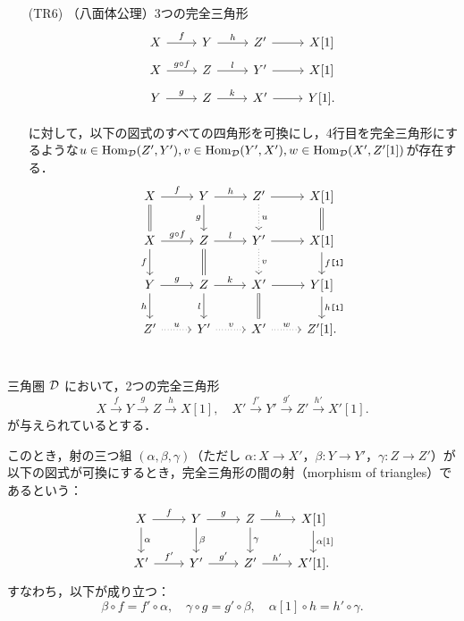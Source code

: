 \begin{defn}
\begin{itemize}
	\item[(TR6)]
		（八面体公理）3つの完全三角形
			\[
				\begin{tikzcd}[row sep=5pt]
			X \ar[r,"f"]& Y\ar[r,"h"]& Z' \ar[r]& X[1]\\
			X \ar[r,"g\circ f"]& Z\ar[r,"l"]& Y' \ar[r]& X[1]\\
			Y \ar[r,"g"]& Z\ar[r,"k"]& X' \ar[r]& Y[1].\\
		\end{tikzcd}
			\]
			に対して，以下の図式のすべての四角形を可換にし，4行目を完全三角形にするような$u\in\operatorname{\mathrm{Hom}}_{{\mathcal D}}(Z',Y'),v\in\operatorname{\mathrm{Hom}}_{{\mathcal D}}(Y',X'),w\in\operatorname{\mathrm{Hom}}_{{\mathcal D}}(X',Z'[1])$が存在する．
			\[
		\begin{tikzcd}
			X \ar[r,"f"]\ar[d,equal]& Y\ar[r,"h"]\ar[d,"g",swap]& Z'\ar[d,"u",dotted] \ar[r]& X[1]\ar[d,equal]\\
			X \ar[r,"g\circ f"]\ar[d,"f",swap]& Z\ar[r,"l"]\ar[d,equal]& Y'\ar[d,"v",dotted] \ar[r]& X[1]\ar[d,"f\texttt{[1]}"]\\
			Y \ar[r,"g"]\ar[d,"h",swap]& Z\ar[r,"k"]\ar[d,"l",swap]& X' \ar[r]\ar[d,equal]& Y[1]\ar[d,"h\texttt{[1]}"]\\
			Z' \ar[r,"u",dotted]& Y'\ar[r,"v",dotted]& X' \ar[r,"w",dotted]& Z'[1].\\
		\end{tikzcd}
			\]
	\end{itemize}
\end{defn}

\begin{defn}\cite[p.243]{KS06}
三角圏 ${\mathcal D}$ において，2つの完全三角形
\[
X \xrightarrow{f} Y \xrightarrow{g} Z \xrightarrow{h} X[1], \quad
X' \xrightarrow{f'} Y' \xrightarrow{g'} Z' \xrightarrow{h'} X'[1].
\]
が与えられているとする．

このとき，射の三つ組 $(\alpha, \beta, \gamma)$（ただし $\alpha \colon X \to X'$，$\beta \colon Y \to Y'$，$\gamma \colon Z \to Z'$）が以下の図式が可換にするとき，完全三角形の間の射（morphism of triangles）であるという：
\[
\begin{tikzcd}
X \arrow{r}{f} \arrow{d}{\alpha} & Y \arrow{r}{g} \arrow{d}{\beta} & Z \arrow{r}{h} \arrow{d}{\gamma} & X[1] \arrow{d}{\alpha[1]} \\
X' \arrow{r}{f'} & Y' \arrow{r}{g'} & Z' \arrow{r}{h'} & X'[1].
\end{tikzcd}
\]
すなわち，以下が成り立つ：
\[
\beta \circ f = f' \circ \alpha, \quad
\gamma \circ g = g' \circ \beta, \quad
\alpha[1] \circ h = h' \circ \gamma.
\]
\end{defn}
